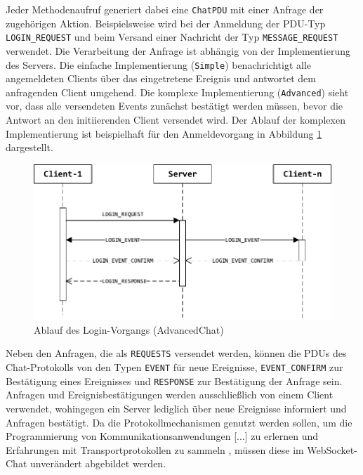 \documentclass[11pt,a4paper,titlepage]{scrartcl}
\numberwithin{equation}{section}
\begin{document}
\noindent Jeder Methodenaufruf generiert dabei eine \texttt{ChatPDU} mit einer Anfrage der zugehörigen Aktion. Beispielsweise wird bei der Anmeldung der PDU-Typ \texttt{LOGIN\_REQUEST} und beim Versand einer Nachricht der Typ \texttt{MESSAGE\_REQUEST} verwendet. Die Verarbeitung der Anfrage ist abhängig von der Implementierung des Servers. Die einfache Implementierung (\texttt{Simple}) benachrichtigt alle angemeldeten Clients über das eingetretene Ereignis und antwortet dem anfragenden Client umgehend. Die komplexe Implementierung (\texttt{Advanced}) sieht vor, dass alle versendeten Events zunächst bestätigt werden müssen, bevor die Antwort an den initiierenden Client versendet wird. Der Ablauf der komplexen Implementierung ist beispielhaft für den Anmeldevorgang in Abbildung \ref{fig:dakoLogin} dargestellt.
\medskip
\begin{figure}[ht] 
	\begin{center}
		\includegraphics[scale=1]{img/DaKoLogin.pdf}
		\caption{Ablauf des Login-Vorgangs (AdvancedChat)}
		\label{fig:dakoLogin}
	\end{center}
\end{figure}

\noindent Neben den Anfragen, die als \texttt{REQUESTS} versendet werden, können die PDUs des Chat-Protokolls von den Typen \texttt{EVENT} für neue Ereignisse, \texttt{EVENT\_CONFIRM} zur Bestätigung eines Ereignisses und \texttt{RESPONSE} zur Bestätigung der Anfrage sein. Anfragen und Ereignisbestätigungen werden ausschließlich von einem Client verwendet, wohingegen ein Server lediglich über neue Ereignisse informiert und Anfragen bestätigt. Da die Protokollmechanismen genutzt werden sollen, um die \glqq Programmierung von Kommunikationsanwendungen [...] zu erlernen und Erfahrungen mit Transportprotokollen zu sammeln\grqq {} \autocite[vgl.][2]{mandl_aufgabenstellung_2017}, müssen diese im WebSocket-Chat unverändert abgebildet werden.\\
\end{document}
